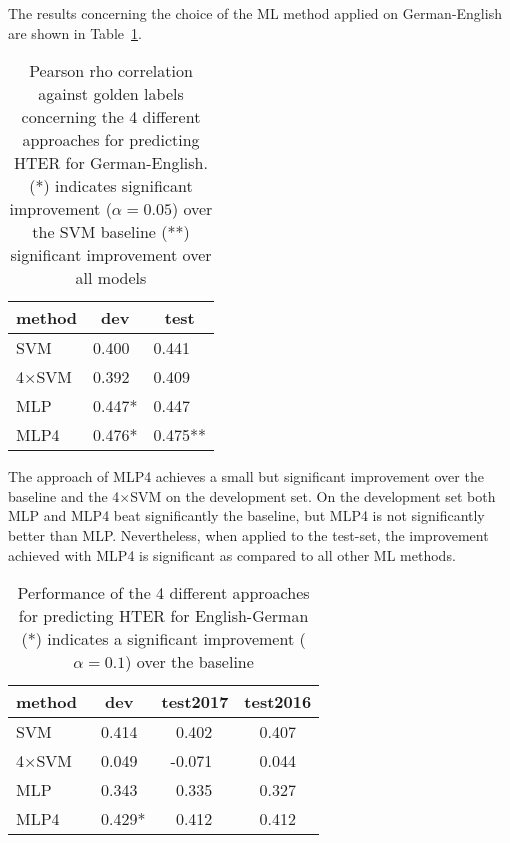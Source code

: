 \documentclass[11pt,letterpaper]{article}
\begin{document}
The results concerning the choice of the ML method applied on German-English are
shown in Table~\ref{tab:de-en}.
\begin{table}[ht] \center
\begin{tabular}{lll}
\toprule
method 	& \multicolumn{1}{c}{dev}	& \multicolumn{1}{c}{test} \\
\midrule
SVM		& 0.400 	& 0.441 	\\
4$\times$SVM	& 0.392 	& 0.409 	\\
MLP     & 0.447* 	& 0.447 	\\
MLP4    & 0.476* 	& 0.475** 	\\
\bottomrule
\end{tabular}
\caption{Pearson rho correlation against golden labels concerning the 4
different approaches for predicting HTER for German-English. (*)
indicates significant improvement ($\alpha=0.05$) over the SVM baseline (**)
significant improvement over all models } 
\label{tab:de-en}
\end{table}


The approach of MLP4 achieves a small but significant improvement over the
baseline and the 4$\times$SVM on the development set.
On the development set both MLP and MLP4 beat significantly the baseline, but
MLP4 is not significantly better than MLP.
Nevertheless, when applied to the test-set, the improvement achieved with MLP4
is significant as compared to all other ML methods.


\begin{table}[ht]
\center
\begin{tabular}{llrc}
\toprule
method 	& \multicolumn{1}{c}{dev}	& \multicolumn{1}{c}{test2017}	& test2016	\\
\midrule
SVM				& ~0.414 & 0.402~~	  & 0.407	\\
4$\times$SVM	& ~0.049	& -0.071~~  &	0.044 \\
MLP     		& ~0.343  & 0.335~~  & 0.327 \\
MLP4   			& ~0.429*  & 0.412~~  & 0.412 \\
\bottomrule
\end{tabular}
\caption{Performance of the 4 different approaches for predicting HTER for
English-German
(*) indicates a significant improvement ($\alpha=0.1$)
over the baseline 
}
\label{tab:en-de}
\end{table}
\end{document}
